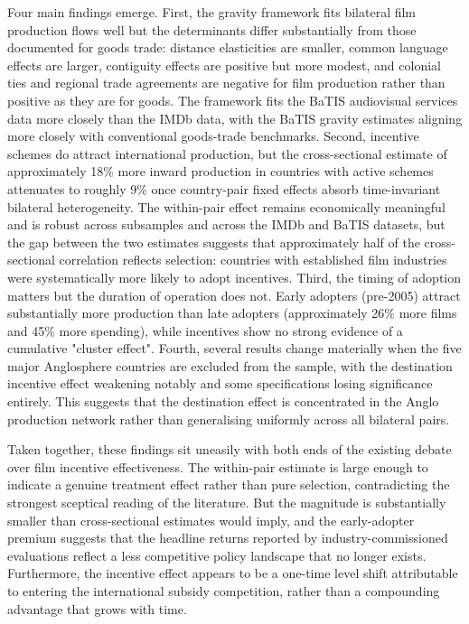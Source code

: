 Four main findings emerge. First, the gravity framework fits bilateral film production flows well but the determinants differ substantially from those documented for goods trade: distance elasticities are smaller, common language effects are larger, contiguity effects are positive but more modest, and colonial ties and regional trade agreements are negative for film production rather than positive as they are for goods. The framework fits the BaTIS audiovisual services data more closely than the IMDb data, with the BaTIS gravity estimates aligning more closely with conventional goods-trade benchmarks. Second, incentive schemes do attract international production, but the cross-sectional estimate of approximately 18\% more inward production in countries with active schemes attenuates to roughly 9\% once country-pair fixed effects absorb time-invariant bilateral heterogeneity. The within-pair effect remains economically meaningful and is robust across subsamples and across the IMDb and BaTIS datasets, but the gap between the two estimates suggests that approximately half of the cross-sectional correlation reflects selection: countries with established film industries were systematically more likely to adopt incentives. Third, the timing of adoption matters but the duration of operation does not. Early adopters (pre-2005) attract substantially more production than late adopters (approximately 26\% more films and 45\% more spending), while incentives show no strong evidence of a cumulative "cluster effect". Fourth, several results change materially when the five major Anglosphere countries are excluded from the sample, with the destination incentive effect weakening notably and some specifications losing significance entirely. This suggests that the destination effect is concentrated in the Anglo production network rather than generalising uniformly across all bilateral pairs.

Taken together, these findings sit uneasily with both ends of the existing debate over film incentive effectiveness. The within-pair estimate is large enough to indicate a genuine treatment effect rather than pure selection, contradicting the strongest sceptical reading of the literature. But the magnitude is substantially smaller than cross-sectional estimates would imply, and the early-adopter premium suggests that the headline returns reported by industry-commissioned evaluations reflect a less competitive policy landscape that no longer exists. Furthermore, the incentive effect appears to be a one-time level shift attributable to entering the international subsidy competition, rather than a compounding advantage that grows with time.

